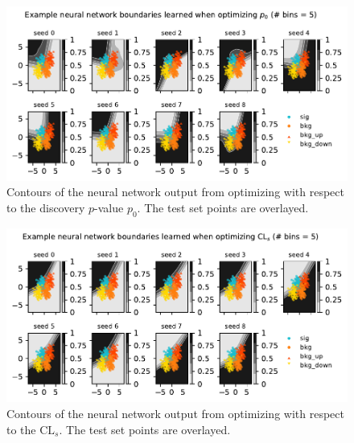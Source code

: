 \documentclass[
  11pt,
  numbers=noendperiod]{book}
\begin{document}
\begin{figure}

{\centering \includegraphics{./images/new-grid-models-discovery-5nobin (1).pdf}

}

\caption{\label{fig-grid-5bin-discovery}Contours of the neural network
output from optimizing with respect to the discovery \(p\)-value
\(p_0\). The test set points are overlayed.}

\end{figure}

\begin{figure}

{\centering \includegraphics{./images/new-grid-models-CLs-5nobin (1).pdf}

}

\caption{\label{fig-grid-5bin-CLs}Contours of the neural network output
from optimizing with respect to the \(\mathrm{CL}_s\). The test set
points are overlayed.}

\end{figure}
\end{document}
